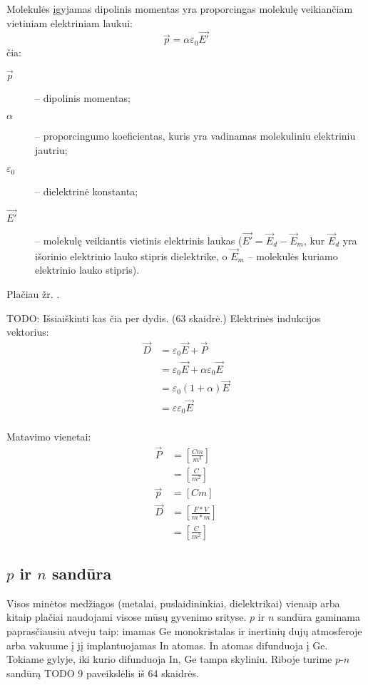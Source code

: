 Molekulės įgyjamas dipolinis momentas yra proporcingas molekulę
veikiančiam vietiniam elektriniam laukui:
\begin{equation*}
  \vec{p} = \alpha \varepsilon_{0} \vec{E'}
\end{equation*}
čia:
\begin{description}
  \item[$\vec{p}$] – dipolinis momentas;
  \item[$\alpha$] – proporcingumo koeficientas, kuris yra vadinamas
    molekuliniu elektriniu jautriu;
  \item[$\varepsilon_{0}$] – dielektrinė konstanta;
  \item[$\vec{E'}$] – molekulę veikiantis vietinis elektrinis laukas
    ($\vec{E'} = \vec{E}_{d} - \vec{E}_{m}$, kur $\vec{E}_{d}$ yra
    išorinio elektrinio lauko stipris dielektrike, o
    $\vec{E}_{m}$ – molekulės kuriamo elektrinio lauko stipris).
\end{description}
Plačiau žr. \cite[38p.]{elektra-magnetizmas}.

TODO: Išsiaiškinti kas čia per dydis. (63 skaidrė.)
Elektrinės indukcijos vektorius:
\begin{align*}
  \vec{D}
  &= \varepsilon_{0}\vec{E} + \vec{P} \\
  &= \varepsilon_{0}\vec{E} + \alpha \varepsilon_{0} \vec{E} \\
  &= \varepsilon_{0}(1 + \alpha)\vec{E} \\
  &= \varepsilon \varepsilon_{0} \vec{E} \\
\end{align*}

Matavimo vienetai:
\begin{align*}
  \vec{P}
  &= \left[ \frac{Cm}{m^3} \right] \\
  &= \left[ \frac{C}{m^2} \right] \\
  \vec{p}
  &= \left[ Cm \right] \\
  \vec{D}
  &= \left[ \frac{F*V}{m*m} \right] \\
  &= \left[ \frac{C}{m^2} \right]
\end{align*}

\subsection{$p$ ir $n$ sandūra}

Visos minėtos medžiagos (metalai, puslaidininkiai, dielektrikai)
vienaip arba kitaip plačiai naudojami visose mūsų gyvenimo
srityse. $p$ ir $n$ sandūra gaminama paprasčiausiu atveju
taip: imamas Ge monokristalas ir inertinių dujų atmosferoje arba
vakuume į jį implantuojamas In atomas. In atomas difunduoja į
Ge. Tokiame gylyje, iki kurio difunduoja In, Ge tampa skyliniu.
Riboje turime $p$-$n$ sandūrą TODO 9 paveikslėlis iš 64 skaidrės.

